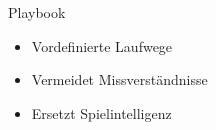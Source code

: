 \hspace{-10cm}Playbook
\begin{itemize}
\item Vordefinierte Laufwege
\item Vermeidet Missverständnisse
\item Ersetzt Spielintelligenz
\end{itemize}
